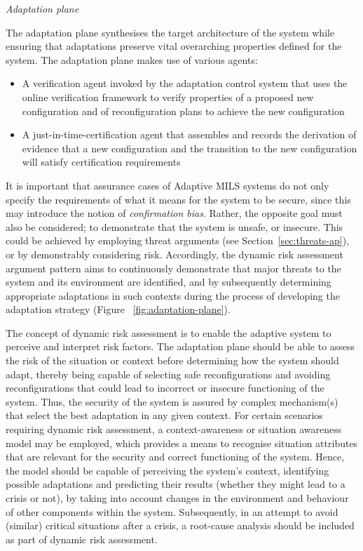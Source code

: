 \documentclass[12pt,twoside,a4paper]{article}
\begin{document}
\clearpage
\emph{Adaptation plane}

The adaptation plane synthesises the target architecture of the system while ensuring that adaptations preserve vital overarching properties defined for the system. The adaptation plane makes use of various agents:
\begin{itemize}
\item A verification agent invoked by the adaptation control system that uses the online verification framework to verify properties of a proposed new configuration and of reconfiguration plans to achieve the new configuration
\item A just-in-time-certification agent that assembles and records the derivation of evidence that a new configuration and the transition to the new configuration will satisfy certification requirements
\end{itemize}

It is important that assurance cases of Adaptive MILS systems do not only specify the requirements of what it means for the system to be secure, since this may introduce the notion of \textit{confirmation bias}. Rather, the opposite goal must also be considered; to demonstrate that the system is unsafe, or insecure. This could be achieved by employing threat arguments (see Section~\ref{sec:threats-ap}), or by demonstrably considering risk. Accordingly, the dynamic risk assessment argument pattern aims to continuously demonstrate that major threats to the system and its environment are identified, and by subsequently determining appropriate adaptations in such contexts during the process of developing the adaptation strategy (Figure ~\ref{fig:adaptation-plane}). 

The concept of dynamic risk assessment is to enable the adaptive system to perceive and interpret risk factors. The adaptation plane should be able to assess the risk of the situation or context before determining how the system should adapt, thereby being capable of selecting safe reconfigurations and avoiding reconfigurations that could lead to incorrect or insecure functioning of the system. Thus, the security of the system is assured by complex mechanism(s) that select the best adaptation in any given context. For certain scenarios requiring dynamic risk assessment, a context-awareness or situation awareness model may be employed, which provides a means to recognise situation attributes that are relevant for the security and correct functioning of the system. Hence, the model should be capable of perceiving the system's context, identifying possible adaptations and predicting their results (whether they might lead to a crisis or not), by taking into account changes in the environment and behaviour of other components within the system. Subsequently, in an attempt to avoid (similar) critical situations after a crisis, a root-cause analysis should be included as part of dynamic risk assessment. 
\end{document}
